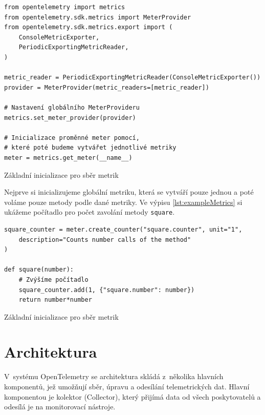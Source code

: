 \begin{listing}[H]
    \begin{verbatim}
from opentelemetry import metrics
from opentelemetry.sdk.metrics import MeterProvider
from opentelemetry.sdk.metrics.export import (
    ConsoleMetricExporter,
    PeriodicExportingMetricReader,
)

metric_reader = PeriodicExportingMetricReader(ConsoleMetricExporter())
provider = MeterProvider(metric_readers=[metric_reader])

# Nastavení globálního MeterProvideru
metrics.set_meter_provider(provider)

# Inicializace proměnné meter pomocí,
# které poté budeme vytvářet jednotlivé metriky
meter = metrics.get_meter(__name__)
\end{verbatim}
    \caption{Základní inicializace pro sběr metrik}
    \label{lst:exampleMeterProvider}
\end{listing}

Nejprve si inicializujeme globální metriku, která se vytváří pouze jednou a poté voláme pouze metody podle dané metriky. Ve výpisu \ref{lst:exampleMetrics} si ukážeme počítadlo pro počet zavolání metody \texttt{square}.

\begin{listing}[H]
    \begin{verbatim}
square_counter = meter.create_counter("square.counter", unit="1",
    description="Counts number calls of the method"
)

def square(number):
    # Zvýšíme počítadlo
    square_counter.add(1, {"square.number": number})
    return number*number
\end{verbatim}
    \caption{Základní inicializace pro sběr metrik}
    \label{lst:exampleMetrics}
\end{listing}

\section{Architektura}
\label{architektura}
V~systému OpenTelemetry se architektura skládá z~několika hlavních komponentů, jež umožňují sběr, úpravu a odesílání telemetrických dat. Hlavní komponentou je kolektor (Collector), který přijímá data od všech poskytovatelů a odesílá je na monitorovací nástroje.

